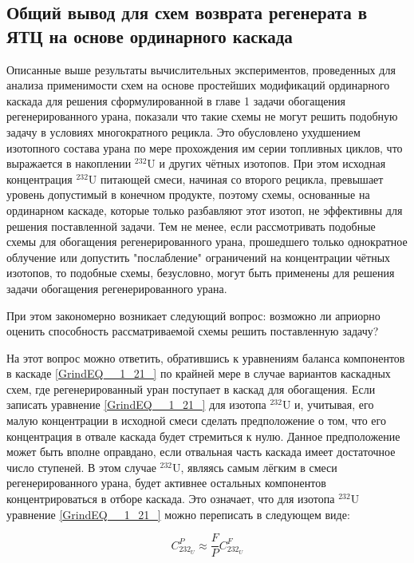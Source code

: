 \subsection{Общий вывод для схем возврата регенерата в ЯТЦ на основе ординарного каскада}

Описанные выше результаты вычислительных экспериментов, проведенных для анализа применимости схем на основе простейших модификаций ординарного каскада для решения сформулированной в главе 1 задачи обогащения регенерированного урана, показали что такие схемы не могут решить подобную задачу в условиях  многократного рецикла. Это обусловлено ухудшением изотопного состава урана по мере прохождения им серии топливных циклов, что выражается в накоплении $^{232}$U и других чётных изотопов. При этом исходная концентрация $^{232}$U питающей смеси, начиная со второго рецикла, превышает уровень допустимый в конечном продукте, поэтому схемы, основанные на ординарном каскаде, которые только разбавляют этот изотоп, не эффективны для решения поставленной задачи. Тем не менее, если рассмотривать подобные схемы для обогащения регенерированного урана, прошедшего только однократное облучение или допустить "послабление" ограничений на концентрации чётных изотопов, то подобные схемы, безусловно, могут быть применены для решения задачи обогащения регенерированного урана.

При этом закономерно возникает следующий вопрос: возможно ли априорно оценить способность рассматриваемой схемы решить поставленную задачу? 

На этот вопрос можно ответить, обратившись к уравнениям баланса компонентов в каскаде \ref{GrindEQ__1_21_} по крайней мере в случае вариантов каскадных схем, где регенерированный уран поступает в каскад для обогащения. Если записать уравнение \ref{GrindEQ__1_21_} для изотопа $^{232}$U и, учитывая, его малую концентрации в исходной смеси сделать предположение о том, что его концентрация в отвале каскада будет стремиться к нулю. Данное предположение может быть вполне оправдано, если отвальная часть каскада имеет достаточное число ступеней. В этом случае $^{232}$U, являясь самым лёгким в смеси регенерированного урана, будет активнее остальных компонентов концентрироваться в отборе каскада. Это означает, что для изотопа $^{232}$U уравнение \ref{GrindEQ__1_21_} можно переписать в следующем виде:

\begin{equation}
\label{eq_232_balance}
  C_{232_{U}}^{P} \approx \frac{F}{P} C_{232_{U}}^{F}
\end{equation}

